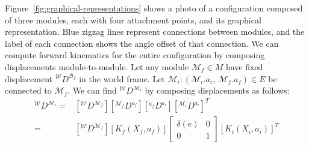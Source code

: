 \documentclass[graybox]{svmult}
\begin{document}
\begin{definition}[Configuration]

Figure~\ref{fig:graphical-representations} shows a photo of a configuration composed
of three modules, each with four attachment points, and its
graphical representation. Blue zigzag lines represent connections between
modules, and the label of each connection shows the angle offset of that
connection.
We can compute forward kinematics for the entire
configuration by composing displacements module-to-module. Let any module \(\mathcal{M}_f \in M\) have
fixed displacement \({^\mathcal{W}}D^{\mathcal{B}_f}\) in the world frame.
Let \(\mathcal{M}_i: (\mathcal{M}_i.a_i,~\mathcal{M}_f.a_f) \in E \) be connected to \(\mathcal{M}_f\).
 We can find \({^\mathcal{W}}D^{\mathcal{M}_i}\) by composing displacements as follows:
\begin{align*}
{^\mathcal{W}}D^{\mathcal{M}_i} =& [{^\mathcal{W}}D^{\mathcal{M}_f}] [{^{\mathcal{M}_f}}D^{a_f}][
{^{a_f}}D^{a_i}] [{^{\mathcal{M}_i}}D^{a_i}]^T \\
=& [{^\mathcal{W}}D^{\mathcal{M}_f}] [K_f(X_f,a_f)] \begin{bmatrix} \delta(e) & 0
\\ 0 & 1\end{bmatrix} [K_i(X_i,a_i)]^T
\end{align*}


\end{definition}
\end{document}
